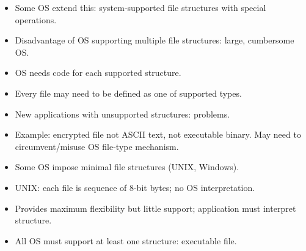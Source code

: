 \begin{itemize}
\item Some OS extend this: system-supported file structures with special operations.
\item Disadvantage of OS supporting multiple file structures: large, cumbersome OS.
\item OS needs code for each supported structure.
\item Every file may need to be defined as one of supported types.
\item New applications with unsupported structures: problems.
\item Example: encrypted file not ASCII text, not executable binary. May need to circumvent/misuse OS file-type mechanism.
\item Some OS impose minimal file structures (UNIX, Windows).
\item UNIX: each file is sequence of 8-bit bytes; no OS interpretation.
\item Provides maximum flexibility but little support; application must interpret structure.
\item All OS must support at least one structure: executable file.
\end{itemize}

